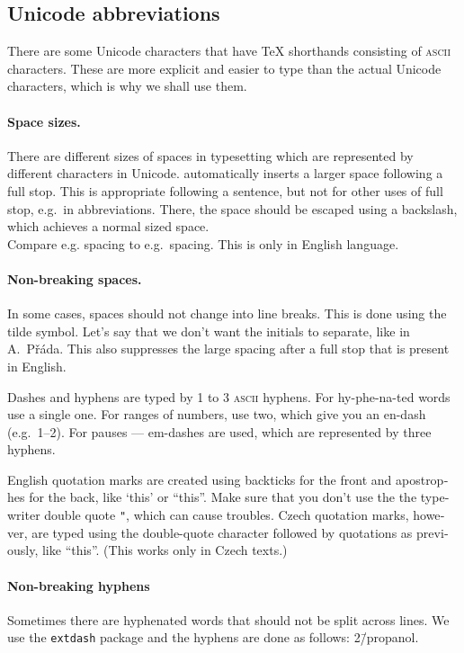 \documentclass{article}
\begin{document}
\subsection{Unicode abbreviations}
There are some Unicode characters that have \TeX{} shorthands consisting of \textsc{ascii} characters. These are more explicit and easier to type than the actual Unicode characters, which is why we shall use them.

\paragraph{Space sizes.} There are different sizes of spaces in typesetting which are represented by different characters in Unicode.  automatically inserts a larger space following a full stop. This is appropriate following a sentence, but not for other uses of full stop, e.g.\ in abbreviations. There, the space should be escaped using a backslash, which achieves a normal sized space.
\\
\textenglish{Compare e.g. spacing to e.g.\ spacing.} This is only in English language.

\paragraph{Non-breaking spaces.} In some cases, spaces should not change into line breaks. This is done using the tilde symbol. Let's say that we don't want the initials to separate, like in A.~Přáda. This also suppresses the large spacing after a full stop that is present in English.

Dashes and hyphens are typed by 1 to 3 \textsc{ascii} hyphens. For hy-phe-na-ted words use a single one. For ranges of numbers, use two, which give you an en-dash (e.g.\ 1--2). For pauses --- em-dashes are used, which are represented by three hyphens.

\textczech{English quotation marks are created using backticks for the front and apostrophes for the back, like `this' or ``this''. Make sure that you don't use the the typewriter double quote \texttt{"}, which can cause troubles. Czech quotation marks, however, are typed using the double-quote character followed by quotations as previously, like "`this"'. (This works only in Czech texts.)}

\paragraph{Non-breaking hyphens} Sometimes there are hyphenated words that should not be split across lines. We use the \texttt{extdash} package and the hyphens are done as follows: 2\=/propanol.\label{importantsection}
\end{document}
